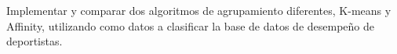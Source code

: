 Implementar y comparar dos algoritmos de agrupamiento diferentes, K-means y Affinity, utilizando como datos a clasificar la base de datos de desempeño de deportistas.